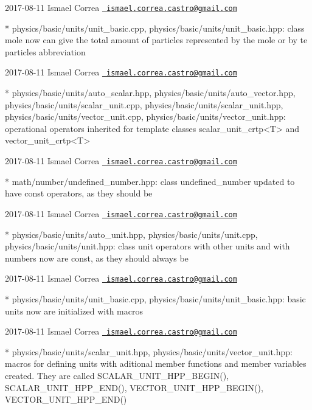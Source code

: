  2017-\/08-\/11 Ismael Correa \href{mailto:ismael.correa.castro@gmail.com}{\texttt{ ismael.\+correa.\+castro@gmail.\+com}} \begin{DoxyVerb}* physics/basic/units/unit_basic.cpp,
physics/basic/units/unit_basic.hpp: class mole now can give the
total amount of particles represented by the mole or by te particles
abbreviation
\end{DoxyVerb}
 2017-\/08-\/11 Ismael Correa \href{mailto:ismael.correa.castro@gmail.com}{\texttt{ ismael.\+correa.\+castro@gmail.\+com}} \begin{DoxyVerb}* physics/basic/units/auto_scalar.hpp,
physics/basic/units/auto_vector.hpp,
physics/basic/units/scalar_unit.cpp,
physics/basic/units/scalar_unit.hpp,
physics/basic/units/vector_unit.cpp,
physics/basic/units/vector_unit.hpp: operational operators inherited
for template classes scalar_unit_crtp<T> and vector_unit_crtp<T>
\end{DoxyVerb}
 2017-\/08-\/11 Ismael Correa \href{mailto:ismael.correa.castro@gmail.com}{\texttt{ ismael.\+correa.\+castro@gmail.\+com}} \begin{DoxyVerb}* math/number/undefined_number.hpp: class undefined_number updated
to have const operators, as they should be
\end{DoxyVerb}
 2017-\/08-\/11 Ismael Correa \href{mailto:ismael.correa.castro@gmail.com}{\texttt{ ismael.\+correa.\+castro@gmail.\+com}} \begin{DoxyVerb}* physics/basic/units/auto_unit.hpp, physics/basic/units/unit.cpp,
physics/basic/units/unit.hpp: class unit operators with other units
and with numbers now are const, as they should always be
\end{DoxyVerb}
 2017-\/08-\/11 Ismael Correa \href{mailto:ismael.correa.castro@gmail.com}{\texttt{ ismael.\+correa.\+castro@gmail.\+com}} \begin{DoxyVerb}* physics/basic/units/unit_basic.cpp,
physics/basic/units/unit_basic.hpp: basic units now are initialized
with macros
\end{DoxyVerb}
 2017-\/08-\/11 Ismael Correa \href{mailto:ismael.correa.castro@gmail.com}{\texttt{ ismael.\+correa.\+castro@gmail.\+com}} \begin{DoxyVerb}* physics/basic/units/scalar_unit.hpp,
physics/basic/units/vector_unit.hpp: macros for defining units with
aditional member functions and member variables created. They are
called SCALAR_UNIT_HPP_BEGIN(), SCALAR_UNIT_HPP_END(),
VECTOR_UNIT_HPP_BEGIN(), VECTOR_UNIT_HPP_END()
\end{DoxyVerb}
